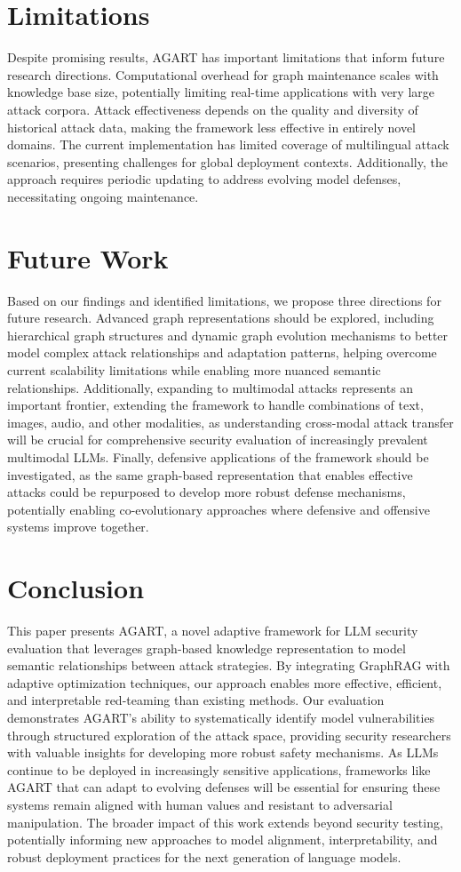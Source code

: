\section{Limitations}
Despite promising results, AGART has important limitations that inform future research directions. Computational overhead for graph maintenance scales with knowledge base size, potentially limiting real-time applications with very large attack corpora. Attack effectiveness depends on the quality and diversity of historical attack data, making the framework less effective in entirely novel domains. The current implementation has limited coverage of multilingual attack scenarios, presenting challenges for global deployment contexts. Additionally, the approach requires periodic updating to address evolving model defenses, necessitating ongoing maintenance.

\section{Future Work}
Based on our findings and identified limitations, we propose three directions for future research. Advanced graph representations should be explored, including hierarchical graph structures and dynamic graph evolution mechanisms to better model complex attack relationships and adaptation patterns, helping overcome current scalability limitations while enabling more nuanced semantic relationships. Additionally, expanding to multimodal attacks represents an important frontier, extending the framework to handle combinations of text, images, audio, and other modalities, as understanding cross-modal attack transfer will be crucial for comprehensive security evaluation of increasingly prevalent multimodal LLMs. Finally, defensive applications of the framework should be investigated, as the same graph-based representation that enables effective attacks could be repurposed to develop more robust defense mechanisms, potentially enabling co-evolutionary approaches where defensive and offensive systems improve together.

\section{Conclusion}
This paper presents AGART, a novel adaptive framework for LLM security evaluation that leverages graph-based knowledge representation to model semantic relationships between attack strategies. By integrating GraphRAG with adaptive optimization techniques, our approach enables more effective, efficient, and interpretable red-teaming than existing methods. Our evaluation demonstrates AGART's ability to systematically identify model vulnerabilities through structured exploration of the attack space, providing security researchers with valuable insights for developing more robust safety mechanisms. As LLMs continue to be deployed in increasingly sensitive applications, frameworks like AGART that can adapt to evolving defenses will be essential for ensuring these systems remain aligned with human values and resistant to adversarial manipulation. The broader impact of this work extends beyond security testing, potentially informing new approaches to model alignment, interpretability, and robust deployment practices for the next generation of language models. 